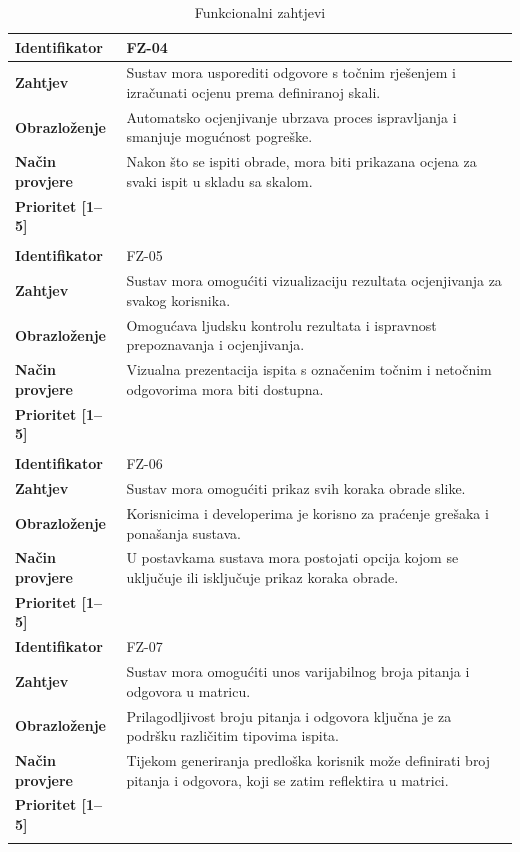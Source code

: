 \documentclass{foi}
\begin{document}
\begin{longtable}{|l|p{12cm}|}
    \textbf{Identifikator} & FZ-04 \\ \hline
    \textbf{Zahtjev} & Sustav mora usporediti odgovore s točnim rješenjem i izračunati ocjenu prema definiranoj skali. \\ \hline
    \textbf{Obrazloženje} & Automatsko ocjenjivanje ubrzava proces ispravljanja i smanjuje mogućnost pogreške. \\ \hline
    \textbf{Način provjere} & Nakon što se ispiti obrade, mora biti prikazana ocjena za svaki ispit u skladu sa skalom. \\ \hline
    \textbf{Prioritet [1--5]} &  \\ \hline
    \multicolumn{2}{|c|}{} \\ \hline
    \pagebreak
    \hline

    \textbf{Identifikator} & FZ-05 \\ \hline
    \textbf{Zahtjev} & Sustav mora omogućiti vizualizaciju rezultata ocjenjivanja za svakog korisnika. \\ \hline
    \textbf{Obrazloženje} & Omogućava ljudsku kontrolu rezultata i ispravnost prepoznavanja i ocjenjivanja. \\ \hline
    \textbf{Način provjere} & Vizualna prezentacija ispita s označenim točnim i netočnim odgovorima mora biti dostupna. \\ \hline
    \textbf{Prioritet [1--5]} &  \\ \hline
    \multicolumn{2}{|c|}{} \\ \hline
    
    \textbf{Identifikator} & FZ-06 \\ \hline
    \textbf{Zahtjev} & Sustav mora omogućiti prikaz svih koraka obrade slike. \\ \hline
    \textbf{Obrazloženje} & Korisnicima i developerima je korisno za praćenje grešaka i ponašanja sustava. \\ \hline
    \textbf{Način provjere} & U postavkama sustava mora postojati opcija kojom se uključuje ili isključuje prikaz koraka obrade. \\ \hline
    \textbf{Prioritet [1--5]} &  \\ \hline
    
    \textbf{Identifikator} & FZ-07 \\ \hline
    \textbf{Zahtjev} & Sustav mora omogućiti unos varijabilnog broja pitanja i odgovora u matricu. \\ \hline
    \textbf{Obrazloženje} & Prilagodljivost broju pitanja i odgovora ključna je za podršku različitim tipovima ispita. \\ \hline
    \textbf{Način provjere} & Tijekom generiranja predloška korisnik može definirati broj pitanja i odgovora, koji se zatim reflektira u matrici. \\ \hline
    \textbf{Prioritet [1--5]} &  \\ \hline
    
    \caption{Funkcionalni zahtjevi}
\end{longtable}
\end{document}
